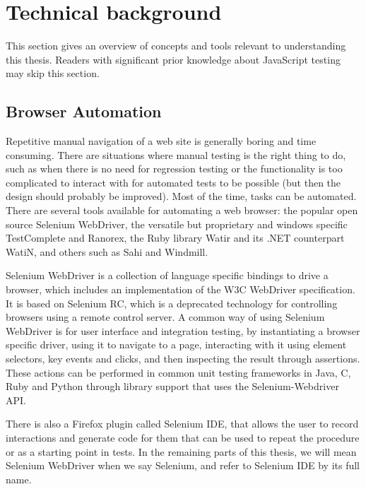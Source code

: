 \documentclass[11pt]{article}
\begin{document}
\section{Technical background}

This section gives an overview of concepts and tools relevant to understanding this thesis. Readers with significant prior knowledge about JavaScript testing may skip this section.

\subsection{Browser Automation}
\label{sec:browserautomation}

Repetitive manual navigation of a web site is generally boring and time consuming. There are situations where manual testing is the right thing to do, such as when there is no need for regression testing or the functionality is too complicated to interact with for automated tests to be possible (but then the design should probably be improved). Most of the time, tasks can be automated. There are several tools available for automating a web browser: the popular open source Selenium WebDriver, the versatile but proprietary and windows specific TestComplete and Ranorex, the Ruby library Watir and its .NET counterpart WatiN, and others such as Sahi and Windmill.

Selenium WebDriver is a collection of language specific bindings to drive a browser, which includes an implementation of the W3C WebDriver specification. It is based on Selenium RC, which is a deprecated technology for controlling browsers using a remote control server. A common way of using Selenium WebDriver is for user interface and integration testing, by instantiating a browser specific driver, using it to navigate to a page, interacting with it using element selectors, key events and clicks, and then inspecting the result through assertions. These actions can be performed in common unit testing frameworks in Java, C\nolinebreak\hspace{-.05em}\raisebox{.3ex}{\scriptsize\bf \#}, Ruby and Python through library support that uses the Selenium-Webdriver API. \cite{Selenium}

There is also a Firefox plugin called Selenium IDE, that allows the user to record interactions and generate code for them that can be used to repeat the procedure or as a starting point in tests. In the remaining parts of this thesis, we will mean Selenium WebDriver when we say Selenium, and refer to Selenium IDE by its full name.
\end{document}
